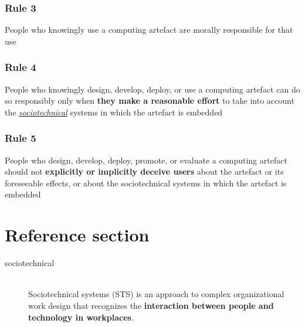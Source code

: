 \documentclass{article}
\newcommand{\worddef}[1]{\hyperref[sec:reference]{\textit{#1}}}
\begin{document}
\subsubsection{Rule 3}
\begin{flushleft}
People who knowingly use a computing artefact are morally responsible for that use
\end{flushleft}

\subsubsection{Rule 4}
\begin{flushleft}
People who knowingly design, develop, deploy, or use a computing artefact can do so responsibly only when \textbf{they make a reasonable effort} to take into account the \worddef{sociotechnical} systems in which the artefact is embedded
\end{flushleft}

\subsubsection{Rule 5}
\begin{flushleft}
People who design, develop, deploy, promote, or evaluate a computing artefact should not \textbf{explicitly or implicitly deceive users} about the artefact or its foreseeable effects, or about the sociotechnical systems in which the artefact is embedded
\end{flushleft}

\pagebreak
\section*{Reference section} \label{sec:reference}
\begin{description}
	\item[sociotechnical] \hfill \\ Sociotechnical systems (STS) is an approach to complex organizational work design that recognizes the \textbf{interaction between people and technology in workplaces}. 
\end{description}
\end{document}
